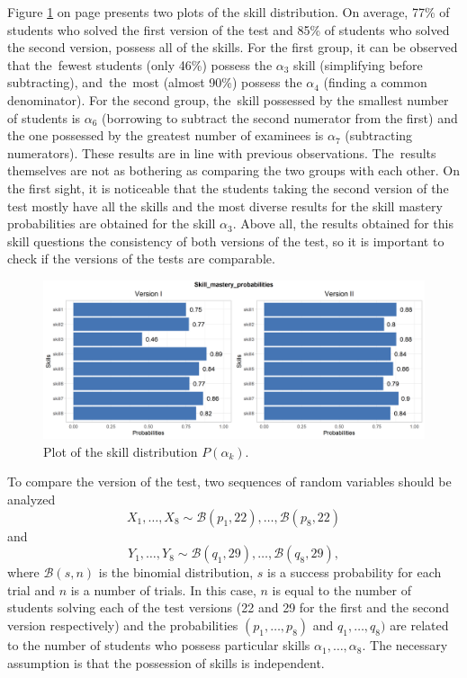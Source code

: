 \documentclass[english]{pwr_wmat_praca_dyplomowa}
\theoremstyle{plain}
\numberwithin{theorem}{chapter}
\theoremstyle{definition}
\numberwithin{theorem}{chapter}
\begin{document}
	Figure \ref{skill_possession_groups} on page \pageref{skill_possession_groups} presents two plots of the skill distribution. On average, 77\% of students who solved the first version of the test and 85\% of students who solved the second version, possess all of the skills. For the first group, it can be observed that the~fewest students (only 46\%) possess the $\alpha_3$ skill (simplifying before subtracting), and~the~most (almost 90\%) possess the $\alpha_4$ (finding a common denominator). For the second group, the~skill possessed by the smallest number of students is $\alpha_6$ (borrowing to subtract the second numerator from the first) and the one possessed by the greatest number of examinees is $\alpha_7$ (subtracting numerators). These results are in line with previous observations. The~results themselves are not as bothering as comparing the two groups with each other. On the first sight, it is noticeable that the students taking the second version of the test mostly have all the skills and the most diverse results for the skill mastery probabilities are obtained for the skill $\alpha_3$. Above all, the results obtained for this skill questions the consistency of both versions of the test, so it is important to check if the versions of the tests are comparable.
	
	\begin{figure}[hb!]
		\centering
		\includegraphics[width=\textwidth]{Skill_mastery_probabilities.png}
		\caption{Plot of the skill distribution $P(\alpha_k)$.}
		\label{skill_possession_groups}
	\end{figure}
	
	To compare the version of the test, two sequences of random variables should be analyzed
	$$ X_1, \ldots, X_8 \sim \mathcal{B}(p_1,22),\ldots,\mathcal{B}(p_8,22) $$
	\noindent and
	$$ Y_1, \ldots, Y_8 \sim \mathcal{B}(q_1,29),\ldots,\mathcal{B}(q_8,29), $$
	where $\mathcal{B}(s,n)$ is the binomial distribution, $s$ is a success probability for each trial and $n$ is a number of trials. In this case, $n$ is equal to the number of students solving each of the test versions (22 and 29 for the first and the second version respectively) and the probabilities $(p_1,\ldots,p_8)$ and $q_1,\ldots,q_8)$ are related to the number of students who possess particular skills $\alpha_1,\ldots,\alpha_8$. The necessary assumption is that the possession of skills is independent. 
	
\end{document}
